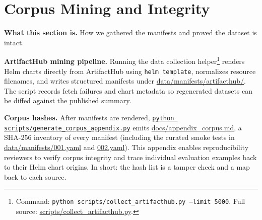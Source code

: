 \documentclass[10pt]{article}
\begin{document}
\section{Corpus Mining and Integrity}
\label{app:corpus}
\noindent\textbf{What this section is.} How we gathered the manifests and proved the dataset is intact.

\noindent\textbf{ArtifactHub mining pipeline.} Running the data collection helper\footnote{Command: \texttt{python scripts/collect\_artifacthub.py --limit 5000}. Full source: \href{https://github.com/bmendonca3/k8s-auto-fix/blob/tcc-2025-12-0666-packet-2026-05-31/scripts/collect_artifacthub.py}{scripts/collect\_artifacthub.py}.} renders Helm charts directly from ArtifactHub using \texttt{helm\ template}, normalizes resource filenames, and writes structured manifests under \href{https://github.com/bmendonca3/k8s-auto-fix/blob/tcc-2025-12-0666-packet-2026-05-31/data/manifests/artifacthub/}{data/manifests/artifacthub/}. The script records fetch failures and chart metadata so regenerated datasets can be diffed against the published summary.

\medskip
\noindent\textbf{Corpus hashes.} After manifests are rendered, \href{https://github.com/bmendonca3/k8s-auto-fix/blob/tcc-2025-12-0666-packet-2026-05-31/scripts/generate_corpus_appendix.py}{\texttt{python scripts/generate\_corpus\_appendix.py}} emits \href{https://github.com/bmendonca3/k8s-auto-fix/blob/tcc-2025-12-0666-packet-2026-05-31/docs/appendix_corpus.md}{docs/appendix\_corpus.md}, a SHA-256 inventory of every manifest (including the curated smoke tests in \href{https://github.com/bmendonca3/k8s-auto-fix/blob/tcc-2025-12-0666-packet-2026-05-31/data/manifests/001.yaml}{data/manifests/001.yaml} and \href{https://github.com/bmendonca3/k8s-auto-fix/blob/tcc-2025-12-0666-packet-2026-05-31/data/manifests/002.yaml}{002.yaml}). This appendix enables reproducibility reviewers to verify corpus integrity and trace individual evaluation examples back to their Helm chart origins. In short: the hash list is a tamper check and a map back to each source.
\end{document}
